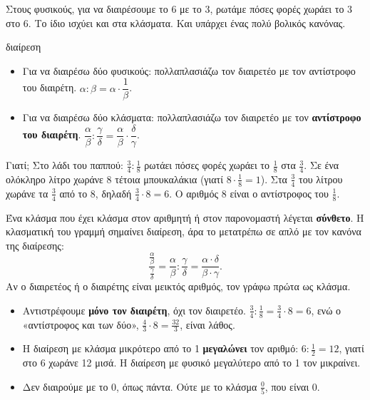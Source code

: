 
Στους φυσικούς, για να διαιρέσουμε το 6 με το 3, ρωτάμε πόσες φορές χωράει το 3 στο 6. Το ίδιο ισχύει και στα κλάσματα. Και υπάρχει ένας πολύ βολικός κανόνας.

\begin{kanonas}{διαίρεση}
\begin{itemize}[leftmargin=1.2em,itemsep=0.3ex,topsep=2pt]
\item Για να διαιρέσω δύο φυσικούς: πολλαπλασιάζω τον διαιρετέο με τον αντίστροφο του διαιρέτη. $\alpha:\beta=\alpha\cdot\dfrac{1}{\beta}$.
\item Για να διαιρέσω δύο κλάσματα: πολλαπλασιάζω τον διαιρετέο με τον \textbf{αντίστροφο του διαιρέτη}. $\dfrac{\alpha}{\beta}:\dfrac{\gamma}{\delta}=\dfrac{\alpha}{\beta}\cdot\dfrac{\delta}{\gamma}$.
\end{itemize}
\end{kanonas}

Γιατί; Στο λάδι του παππού: $\frac{3}{4}:\frac{1}{8}$ ρωτάει πόσες φορές χωράει το $\frac{1}{8}$ στα $\frac{3}{4}$. Σε ένα ολόκληρο λίτρο χωράνε 8 τέτοια μπουκαλάκια (γιατί $8\cdot\frac{1}{8}=1$). Στα $\frac{3}{4}$ του λίτρου χωράνε τα $\frac{3}{4}$ από το 8, δηλαδή $\frac{3}{4}\cdot 8=6$. Ο αριθμός 8 είναι ο αντίστροφος του $\frac{1}{8}$.


Ένα κλάσμα που έχει κλάσμα στον αριθμητή ή στον παρονομαστή λέγεται \textbf{σύνθετο}. Η κλασματική του γραμμή σημαίνει διαίρεση, άρα το μετατρέπω σε απλό με τον κανόνα της διαίρεσης:
$$\dfrac{\frac{\alpha}{\beta}}{\frac{\gamma}{\delta}}=\dfrac{\alpha}{\beta}:\dfrac{\gamma}{\delta}=\dfrac{\alpha\cdot\delta}{\beta\cdot\gamma}.$$
Αν ο διαιρετέος ή ο διαιρέτης είναι μεικτός αριθμός, τον γράφω πρώτα ως κλάσμα.

\begin{prosoxi}
\begin{itemize}[leftmargin=1.2em,itemsep=0.3ex,topsep=2pt]
\item Αντιστρέφουμε \textbf{μόνο τον διαιρέτη}, όχι τον διαιρετέο. $\frac{3}{4}:\frac{1}{8}=\frac{3}{4}\cdot 8=6$, ενώ ο «αντίστροφος και των δύο», $\frac{4}{3}\cdot 8=\frac{32}{3}$, είναι λάθος.
\item Η διαίρεση με κλάσμα μικρότερο από το 1 \textbf{μεγαλώνει} τον αριθμό: $6:\frac{1}{2}=12$, γιατί στο 6 χωράνε 12 μισά. Η διαίρεση με φυσικό μεγαλύτερο από το 1 τον μικραίνει.
\item Δεν διαιρούμε με το 0, όπως πάντα. Ούτε με το κλάσμα $\frac{0}{5}$, που είναι 0.
\end{itemize}
\end{prosoxi}

